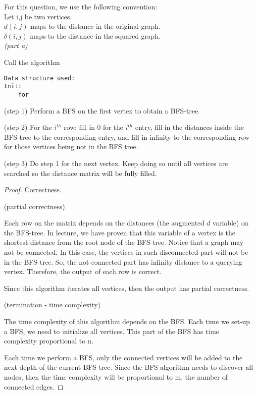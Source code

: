 \documentclass[a4paper, 10pt]{article}
\begin{document}
{\setmainfont{Arial}

For this question, we use the following convention:\\
Let i,j be two vertices.\\
$d(i,j)$ maps to the distance in the original graph.\\
$\delta(i,j)$ maps to the distance in the squared graph.\\

{\noindent\large\it(part a)}

{\setmainfont{Times New Roman}
Call the algorithm 
\begin{lstlisting}
Data structure used:
Init:
    for 
\end{lstlisting}

(step 1) Perform a BFS on the first vertex to obtain a BFS-tree.

(step 2) For the $i^{th}$ row: fill in 0 for the $i^{th}$ entry, fill in the distances inside the BFS-tree to the corresponding entry, and fill in infinity to the corresponding row for those vertices being not in the BFS tree.

(step 3) Do step 1 for the next vertex. Keep doing so until all vertices are searched so the distance matrix will be fully filled.
}

\begin{proof}
Correctness.

(partial correctness)

Each row on the matrix depends on the distances (the augmented $d$ variable) on the BFS-tree. In lecture, we have proven that this variable of a vertex is the shortest distance from the root node of the BFS-tree. Notice that a graph may not be connected. In this case, the vertices in such disconnected part will not be in the BFS-tree. So, the not-connected part has infinity distance to a querying vertex. Therefore, the output of each row is correct.

Since this algorithm iterates all vertices, then the output has partial correctness.

(termination - time complexity)

The time complexity of this algorithm depends on the BFS. Each time we set-up a BFS, we need to initialize all vertices. This part of the BFS has time complexity proportional to n.

Each time we perform a BFS, only the connected vertices will be added to the next depth of the current BFS-tree. Since the BFS algorithm needs to discover all nodes, then the time complexity will be proportional to m, the number of connected edges.


\end{proof}}
\end{document}
